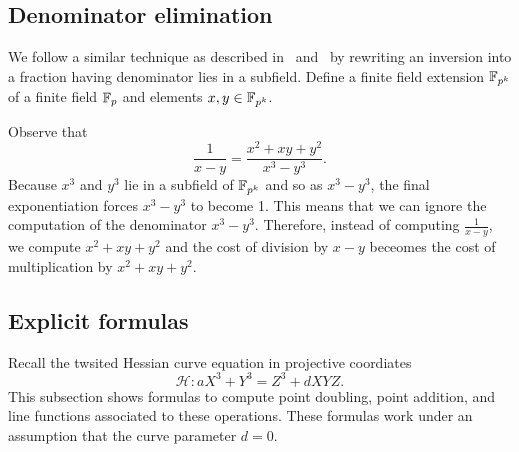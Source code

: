 %
%
%


\subsection{Denominator elimination}
We follow a similar technique as described in~\cite{2008/lin} and~\cite{2009/deg15}
by rewriting an inversion into a fraction having denominator lies in a subfield.
Define a finite field extension $\mathbb{F}_{p^k}$ of a finite field $\mathbb{F}_{p}$
and elements $x,y \in \mathbb{F}_{p^k}$.

Observe that
$$ \frac{1}{x-y} = \frac{x^2 + xy + y^2}{x^3 - y^3}. $$
Because $x^3$ and $y^3$ lie in a subfield of $\mathbb{F}_{p^k}$ and so as $x^3 - y^3$,
the final exponentiation forces $x^3 - y^3$ to become 1.
This means that we can ignore the computation of the denominator $x^3 - y^3$.
Therefore, instead of computing $\frac{1}{x-y}$,
we compute $x^2 + xy + y^2$
and the cost of division by $x - y$ beceomes the cost of multiplication by $x^2 + xy + y^2$.


\subsection{Explicit formulas}

Recall the twsited Hessian curve equation in projective coordiates
$$ \mathcal{H}: a X^3 + Y^3 = Z^3 + d X Y Z. $$
This subsection shows formulas to compute point doubling, point addition, and line functions associated to these operations.
These formulas work under an assumption that the curve parameter $d = 0$.

